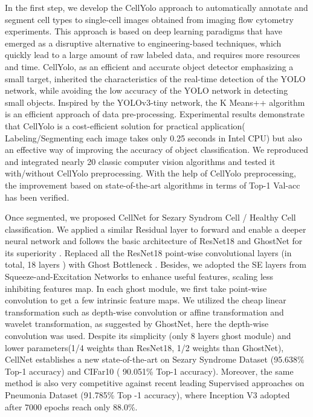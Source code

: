 In the first step, we develop the CellYolo approach to automatically annotate and segment cell types to single-cell images obtained from imaging flow cytometry experiments. This approach is based on deep learning paradigms that have emerged as a disruptive alternative to engineering-based techniques, which quickly lead to a large amount of raw labeled data, and requires more resources and time. CellYolo, as an efficient and accurate object detector emphasizing a small target, inherited the characteristics of the real-time detection of the YOLO network\cite{33}, while avoiding the low accuracy of the YOLO network in detecting small objects. Inspired by the YOLOv3-tiny network, the K Means++ algorithm is an efficient approach of data pre-processing\cite{18}. Experimental results demonstrate that CellYolo is a cost-efficient solution for practical application( Labeling/Segmenting each image takes only 0.25 seconds in Intel CPU) but also an effective way of improving the accuracy of object classification. We reproduced and integrated nearly 20 classic computer vision algorithms and tested it with/without CellYolo preprocessing. With the help of CellYolo preprocessing, the improvement based on state-of-the-art algorithms in terms of Top-1 Val-acc has been verified.

Once segmented, we proposed CellNet for Sezary Syndrom Cell / Healthy Cell classification. We applied a similar Residual layer to forward and enable a deeper neural network and follows the basic architecture of ResNet18 and GhostNet for its superiority \cite{19}\cite{20}. Replaced all the ResNet18 \cite{20} point-wise convolutional layers (in total, 18 layers ) with Ghost Bottleneck \cite{19}. Besides, we adopted the SE layers from Squeeze-and-Excitation Networks \cite{24} to enhance useful features, scaling less inhibiting features map. In each ghost module, we first take point-wise convolution to get a few intrinsic feature maps. We utilized the cheap linear transformation such as depth-wise convolution or affine transformation and wavelet transformation, as suggested by GhostNet\cite{19}, here the depth-wise convolution was used.
Despite its simplicity (only 8 layers ghost module) and lower parameters(1/4 weights than ResNet18\cite{20}, 1/2 weights than GhostNet\cite{19}), CellNet establishes a new state-of-the-art on Sezary Syndrome Dataset (95.638\% Top-1 accuracy) and CIFar10 ( 90.051\% Top-1 accuracy)\cite{21}. Moreover, the same method is also very competitive against recent leading Supervised approaches on Pneumonia Dataset (91.785\% Top -1 accuracy), where Inception V3 adopted after 7000 epochs reach only 88.0\%\cite{38}.

